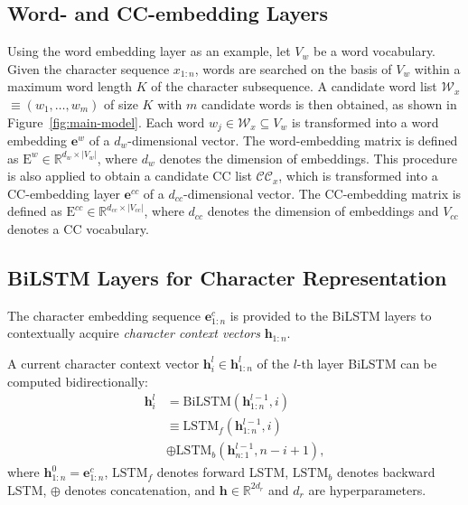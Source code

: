\subsection{Word- and CC-embedding Layers}\label{section:word-cc-embed}
Using the word embedding layer as an example, let $V_{w}$ be a word vocabulary.
%
Given the character sequence $x_{1:n}$, words are searched on the basis of $V_{w}$ within a maximum word length $K$ of the character subsequence. 
% 
A candidate word list $\mathcal{W}_{x}$ $\equiv (w_{1}, \dots, w_{m})$ of size $K$ with $m$ candidate words is then obtained, as shown in Figure~\ref{fig:main-model}.
%
Each word $w_{j} \in \mathcal{W}_{x} \subseteq V_{w}$ is transformed into a word embedding $\textbf{e}^{w}$ of a $d_{w}$-dimensional vector. 
%
The word-embedding matrix is defined as $\text{E}^{w} \in \mathbb{R}^{d_{w} \times |V_{w}|}$, where $d_{w}$ denotes the dimension of embeddings.
%
This procedure is also applied to obtain a candidate CC list $\mathcal{CC}_{x}$, which is transformed into a CC-embedding layer $\textbf{e}^{cc}$ of a $d_{cc}$-dimensional vector. 
%
The CC-embedding matrix is defined as $\text{E}^{cc} \in \mathbb{R}^{d_{cc} \times |V_{cc}|}$, where $d_{cc}$ denotes the dimension of embeddings and $V_{cc}$ denotes a CC vocabulary.

\subsection{BiLSTM Layers for Character Representation}\label{section:bilstm-for-char}
The character embedding sequence $\textbf{e}_{1:n}^{c}$ is provided to the BiLSTM \cite{Hochreiter1997,Gers2000} layers to contextually acquire \textit{character context vectors} $\textbf{h}_{1:n}$.
%

A current character context vector $\textbf{h}_{i}^{l} \in \textbf{h}_{1:n}^{l}$ of the $l$-th layer BiLSTM can be computed bidirectionally:
%
\begin{equation}
    \begin{split}
        \textbf{h}^{l}_{i} &= \text{BiLSTM}(\textbf{h}^{l-1}_{1:n}, i) \\
        & \equiv \text{LSTM}_f(\textbf{h}^{l-1}_{1:n}, i) \\
        & \oplus \text{LSTM}_b(\textbf{h}^{l-1}_{n:1}, n-i+1),
    \end{split}
    \label{eq:bilstm}
\end{equation}
where $\textbf{h}^{0}_{1:n} = \textbf{e}_{1:n}^{c}$, $\text{LSTM}_{f}$ denotes forward LSTM, $\text{LSTM}_{b}$ denotes backward LSTM, $\oplus$ denotes concatenation, and $\textbf{h} \in \mathbb{R}^{2d_{r}}$ and $d_{r}$ are hyperparameters.


